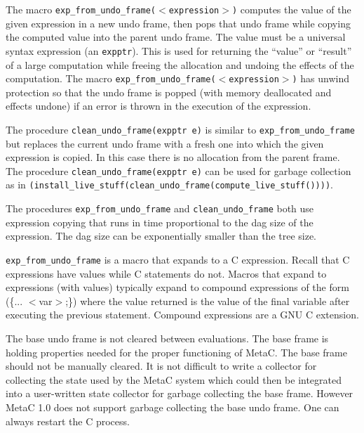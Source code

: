 \documentclass{article}
\begin{document}
The macro {\tt exp\_from\_undo\_frame($<$expression$>$)} computes the value of the given expression in a new undo frame, then pops that undo frame while
copying the computed value into the parent undo frame.  The value must be a universal syntax expression
(an {\tt expptr}). This is used for returning the ``value'' or ``result'' of a large computation while freeing the allocation and undoing the effects of the computation.
The macro {\tt exp\_from\_undo\_frame($<$expression$>$)} has unwind protection so that the undo frame is popped (with memory deallocated and effects undone)
if an error is thrown in the execution of the expression.

The procedure {\tt clean\_undo\_frame(expptr e)} is similar to {\tt exp\_from\_undo\_frame} but replaces the current undo frame with a fresh one
into which the given expression is copied.  In this case there is no allocation from the parent frame.
The procedure {\tt clean\_undo\_frame(expptr e)} can be used for garbage collection
as in {\tt (install\_live\_stuff(clean\_undo\_frame(compute\_live\_stuff())))}.

The procedures {\tt exp\_from\_undo\_frame} and {\tt clean\_undo\_frame} both use expression copying that runs
in time proportional to the dag size of the expression. The dag size can be exponentially smaller than the tree size.

{\tt exp\_from\_undo\_frame} is a macro that expands to a C expression.  Recall that C expressions have values
while C statements do not.  Macros that expand to expressions (with values)
typically expand to compound expressions of the form (\{... $<$var$>$;\}) where the value returned
is the value of the final variable after executing the previous statement.  Compound expressions are a GNU C extension.

The base undo frame is not cleared between evaluations. The base frame is holding properties needed for
the proper functioning of MetaC.
The base frame should not be manually cleared.  It is not difficult to write a collector for collecting the state used by the MetaC system which could then be integrated
into a user-written state collector for garbage collecting the base frame.  However MetaC 1.0 does not support garbage collecting the base undo frame.  One can always
restart the C process.
\end{document}
